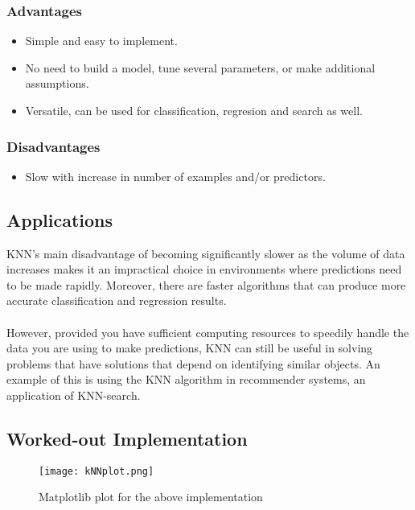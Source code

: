 	\subsubsection*{Advantages}
	\begin{itemize}
		\item Simple and easy to implement.
		\item No need to build a model, tune several parameters, or make additional assumptions.
		\item Versatile, can be used for classification, regresion and search as well.
	\end{itemize}

	\subsubsection*{Disadvantages}
	\begin{itemize}
		\item Slow with increase in number of examples and/or predictors.
	\end{itemize}
	
\subsection*{Applications}
	KNN’s main disadvantage of becoming significantly slower as the volume of data increases makes it an impractical choice in environments where predictions need to be made rapidly. Moreover, there are faster algorithms that can produce more accurate classification and regression results.\\ \\
	However, provided you have sufficient computing resources to speedily handle the data you are using to make predictions, KNN can still be useful in solving problems that have solutions that depend on identifying similar objects. An example of this is using the KNN algorithm in recommender systems, an application of KNN-search.

\subsection*{Worked-out Implementation}


\begin{figure}[h]
	\centering
	\texttt{[image: kNNplot.png]}
	\caption{Matplotlib plot for the above implementation}
\end{figure}